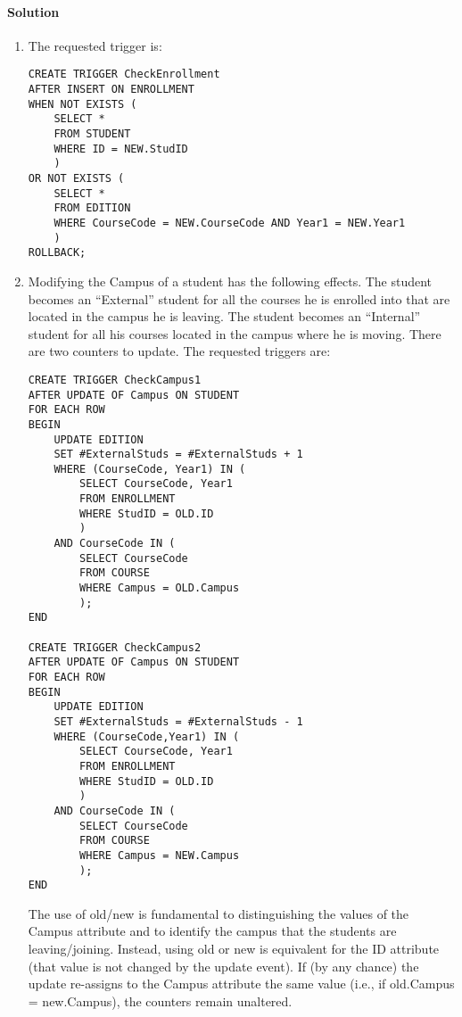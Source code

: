 \paragraph*{Solution}
\begin{enumerate}
    \item The requested trigger is: 
        \begin{lstlisting}[style=SQL]
CREATE TRIGGER CheckEnrollment
AFTER INSERT ON ENROLLMENT
WHEN NOT EXISTS ( 
    SELECT *
    FROM STUDENT
    WHERE ID = NEW.StudID 
    )
OR NOT EXISTS ( 
    SELECT *
    FROM EDITION
    WHERE CourseCode = NEW.CourseCode AND Year1 = NEW.Year1 
    )
ROLLBACK;
        \end{lstlisting}
    \item Modifying the Campus of a student has the following effects. 
        The student becomes an “External” student for all the courses he is enrolled into that are located in the campus he is leaving. 
        The student becomes an “Internal” student for all his courses located in the campus where he is moving.
        There are two counters to update.
        The requested triggers are:
        \begin{lstlisting}[style=SQL]
CREATE TRIGGER CheckCampus1
AFTER UPDATE OF Campus ON STUDENT
FOR EACH ROW
BEGIN
    UPDATE EDITION
    SET #ExternalStuds = #ExternalStuds + 1
    WHERE (CourseCode, Year1) IN (
        SELECT CourseCode, Year1
        FROM ENROLLMENT
        WHERE StudID = OLD.ID 
        )
    AND CourseCode IN ( 
        SELECT CourseCode
        FROM COURSE
        WHERE Campus = OLD.Campus 
        );
END

CREATE TRIGGER CheckCampus2
AFTER UPDATE OF Campus ON STUDENT
FOR EACH ROW
BEGIN
    UPDATE EDITION
    SET #ExternalStuds = #ExternalStuds - 1
    WHERE (CourseCode,Year1) IN (
        SELECT CourseCode, Year1
        FROM ENROLLMENT
        WHERE StudID = OLD.ID
        )
    AND CourseCode IN ( 
        SELECT CourseCode
        FROM COURSE
        WHERE Campus = NEW.Campus
        );
END
        \end{lstlisting}
        The use of old/new is fundamental to distinguishing the values of the Campus attribute and to identify the campus that the students are leaving/joining. 
        Instead, using old or new is equivalent for the ID attribute (that value is not changed by the update event).
        If (by any chance) the update re-assigns to the Campus attribute the same value (i.e., if old.Campus = new.Campus), the counters remain unaltered.
\end{enumerate}